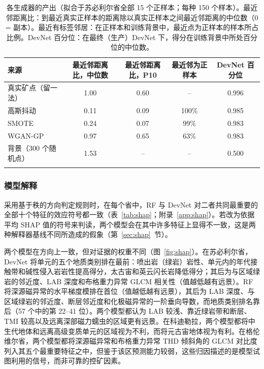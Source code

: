 \documentclass[pdflatex,sn-apa]{sn-jnl}
\begin{document}
\begin{table}[t]
\caption{各生成器的产出（拟合于苏必利尔省全部 15 个正样本；每种 150 个样本）。最近邻距离比：到最近真实正样本的距离除以真实正样本之间最近邻距离的中位数（0 = 副本）。最近有标签邻居：在正样本和训练背景中，最近点为正样本的样本所占比例。DevNet 百分位：在最终（生产）DevNet 下，得分在训练背景中所处百分位的中位数。}\label{tab:aug-diag}
\footnotesize
\setlength{\tabcolsep}{2.5pt}
\begin{tabular*}{\textwidth}{@{\extracolsep\fill}lcccc}
\toprule
来源 & 最近邻距离比，中位数 & 最近邻距离比，P10 & 最近邻为正样本 & DevNet 百分位 \\
\midrule
真实矿点（留一法） & 1.00 & 0.60 & -- & 0.996 \\
高斯抖动 & 0.11 & 0.09 & 100\% & 0.985 \\
SMOTE & 0.24 & 0.07 & 99\% & 0.983 \\
WGAN-GP & 0.97 & 0.65 & 63\% & 0.983 \\
背景（300 个随机点） & 1.53 & -- & -- & 0.500 \\
\botrule
\end{tabular*}
\end{table}

\subsubsection{模型解释}\label{sec:res-shap}

采用基于秩的方向判定规则时，在每个省中，RF 与 DevNet 对二者共同最重要的全部十个特征的效应符号都一致（表~\ref{tab:shap}；附录~\ref{app:shap}）。若改为依据平均 SHAP 值的符号来判读，两个模型会在其中许多特征上显得不一致，这是两种解释器基线不同所造成的假象（第~\ref{sec:shap}~节）。

两个模型在方向上一致，但对证据的权重不同（图~\ref{fig:shap}）。在苏必利尔省，DevNet 将单元的五个地质类别排在最前：喷出岩（绿岩）岩性、单元内的年代接触带和碱性侵入岩岩性提高得分，太古宙和英云闪长岩降低得分；其后为与区域绿岩的邻近度、LAB 深度和布格重力异常 GLCM 相关性（值越低越有远景）。RF 将深源磁异常的水平梯度模排在首位（值越低越有远景），其后为 LAB 深度、与区域绿岩的邻近度、断层邻近度和化极磁异常的一阶垂向导数，而地质类别排名靠后（57 个中的第 22--41 位）。两个模型都认为 LAB 较浅、靠近绿岩带和断层、TMI 较高以及远离深部磁力蠕虫的区域更有远景。在科迪勒拉，两个模型都将中生代地体和远离高级变质单元的区域视为不利，而将元古宙地体视为有利。在格伦维尔省，两个模型都将深源磁异常和布格重力异常 THD 倾斜角的 GLCM 对比度列入其五个最重要特征之中，但鉴于该区预测能力较弱，这些归因描述的是模型试图利用的信号，而非可靠的控矿因素。
\end{document}
